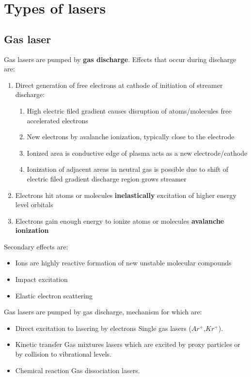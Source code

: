 \chapter{Types of lasers}

\section{Gas laser}
Gas lasers are pumped by \textbf{gas discharge}. Effects that occur during discharge are:
\begin{enumerate}
    \item Direct generation of free electrons at cathode of initiation of streamer discharge: 
    \begin{enumerate}
        \item High electric filed gradient causes disruption of atoms/molecules \pd free accelerated electrons
        \item New electrons by avalanche ionization, typically close to the electrode
        \item Ionized area is conductive \pd edge of plasma acts as a new electrode/cathode
        \item Ionization of adjacent areas in neutral gas is possible due to shift of electric filed gradient \pd discharge region grows \pd streamer   
    \end{enumerate}
    \item Electrons hit atoms or molecules \textbf{inelastically} \pd excitation of higher energy level orbitals
    \item Electrons gain enough energy to ionize atoms or molecules \pd \textbf{avalanche ionization}
\end{enumerate}

Secondary effects are:
\begin{itemize}
    \item Ions are highly reactive \pd formation of new unstable molecular compounds
    \item Impact excitation
    \item Elastic electron scattering
\end{itemize}

Gas lasers are pumped by gas discharge, mechanism for which are:
\begin{itemize}
    \item Direct excitation to lasering by electrons \pd Single gas lasers ($Ar^+$,$Kr^+$).
    \item Kinetic transfer \pd Gas mixtures lasers which are excited by proxy particles or by collision to vibrational levels.
    \item Chemical reaction \pd Gas dissociation lasers. 
\end{itemize}

